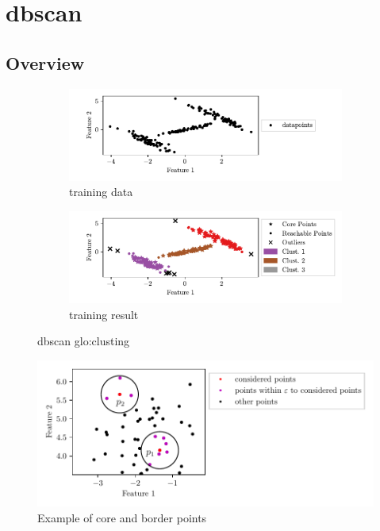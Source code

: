 \section{\gls{dbscan}}
\label{sec:dbscan}

\subsection{Overview}

\begin{figure}[htbp]
    \centering
    \begin{subfigure}{\textwidth}
    \includegraphics[width=\textwidth]{images/DBSCAN/Figure_1.pdf}
    \caption{training data}
    \label{fig:dbscandata}
    \end{subfigure}
    \begin{subfigure}{\textwidth}
    \includegraphics[width=\textwidth]{images/DBSCAN/Figure_2.pdf}
    \caption{training result}
    \label{fig:dbscanresult}
    \end{subfigure}
    \caption{\gls{dbscan} \gls{glo:clust}ing}
    \label{fig:dbscan}
\end{figure}

\begin{figure}
    \centering
    \includegraphics[width=\textwidth]{images/DBSCAN/Figure_3.pdf}
    \caption{Example of core and border points}
    \label{fig:dbscanparams}
\end{figure}

